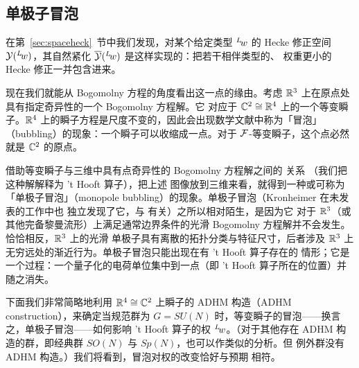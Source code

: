
\subsection{单极子冒泡} \label{sec:monbub}

在第~\ref{sec:spaceheck}~节中我们发现，对某个给定类型
$^L\negthinspace w$ 的 Hecke 修正空间
${{\EUY}}(^L\negthinspace w)$，其自然紧化
$\bar {{\EUY}}(^L\negthinspace w)$ 是这样实现的：把若干相伴类型的、
权重更小的 Hecke 修正一并包含进来。

现在我们就能从 Bogomolny 方程的角度看出这一点的缘由。考虑
$\Bbb{R}^3$ 上在原点处具有指定奇异性的一个 Bogomolny 方程解。它
对应于 $\Bbb{C}^2\cong \Bbb{R}^4$ 上的一个等变瞬子。$\Bbb{R}^4$
上的瞬子方程是尺度不变的，因此会出现数学文献中称为「冒泡」
（bubbling）的现象：一个瞬子可以收缩成一点。对于
${\EUF}$-等变瞬子，这个点必然就是 $\Bbb{C}^2$ 的原点。

借助等变瞬子与三维中具有点奇异性的 Bogomolny 方程解之间的
关系 \cite{ref110}（我们把这种解解释为 't Hooft 算子），把上述
图像放到三维来看，就得到一种或可称为「单极子冒泡」（monopole
bubbling）的现象。单极子冒泡（Kronheimer 在未发表的工作中也
独立发现了它，与 \cite{ref110} 有关）之所以相对陌生，是因为它
对于 $\Bbb{R}^3$（或其他完备黎曼流形）上满足通常边界条件的光滑
Bogomolny 方程解并不会发生。恰恰相反，$\Bbb{R}^3$ 上的光滑
单极子具有离散的拓扑分类与特征尺寸，后者涉及 $\Bbb{R}^3$ 上
无穷远处的渐近行为。单极子冒泡只能出现在有 't Hooft 算子存在的
情形；它是一个过程：一个量子化的电荷单位集中到一点（即
't Hooft 算子所在的位置）并随之消失。

下面我们非常简略地利用 $\Bbb{R}^4\cong \Bbb{C}^2$ 上瞬子的
ADHM 构造（ADHM construction）\cite{ref125}，来确定当规范群为
$G=SU(N)$ 时，等变瞬子的冒泡——换言之，单极子冒泡——如何影响
't Hooft 算子的权 $^L\negthinspace w$。（对于其他存在 ADHM
构造的群，即经典群 $SO(N)$ 与 $Sp(N)$，也可以作类似的分析。但
例外群没有 ADHM 构造。）我们将看到，冒泡对权的改变恰好与预期
相符。

